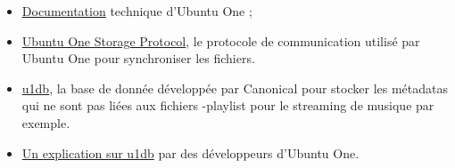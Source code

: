 \begin{itemize}
\renewcommand{\labelitemi}{$\bullet$}
\item \href{https://wiki.ubuntu.com/UbuntuOne/TechnicalDetails}{Documentation} technique d'Ubuntu One ;
\item \href{http://bazaar.launchpad.net/~ubuntuone-control-tower/ubuntuone-storage-protocol/trunk/files}{Ubuntu One Storage Protocol}, le protocole de communication utilisé par Ubuntu One pour synchroniser les fichiers.
\item \href{https://one.ubuntu.com/developer/data/u1db/index}{u1db}, la base de donnée développée par Canonical pour stocker les métadatas qui ne sont pas liées aux fichiers -playlist pour le streaming de musique par exemple.
\item \href{https://github.com/onitu/Epitech.EIP/wiki/Discussion-du-03-03-13-avec-Chipaca-sur-\%23u1db}{Un explication sur u1db} par des développeurs d'Ubuntu One.
\end{itemize}
